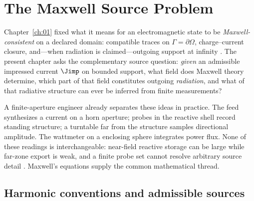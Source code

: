 
\section{The Maxwell Source Problem}
\label{sec:ch02.1}

Chapter~\ref{ch:01} fixed what it means for an electromagnetic state to be \emph{Maxwell-consistent} on a declared domain: compatible traces on $\Gamma=\partial\Omega$, charge--current closure, and---when radiation is claimed---outgoing support at infinity \cite{maxwell1873,stratton1941}. The present chapter asks the complementary source question: \emph{given} an admissible impressed current $\Jimp$ on bounded support, what field does Maxwell theory determine, which part of that field constitutes outgoing \emph{radiation}, and what of that radiative structure can ever be inferred from finite measurements?

A finite-aperture engineer already separates these ideas in practice. The feed synthesizes a current on a horn aperture; probes in the reactive shell record standing structure; a turntable far from the structure samples directional amplitude. The wattmeter on a enclosing sphere integrates power flux. None of these readings is interchangeable: near-field reactive storage can be large while far-zone export is weak, and a finite probe set cannot resolve arbitrary source detail \cite{harrington2001,hansen1988}. Maxwell's equations supply the common mathematical thread.

\subsection{Harmonic conventions and admissible sources}
\label{sec:ch02.1.1}

